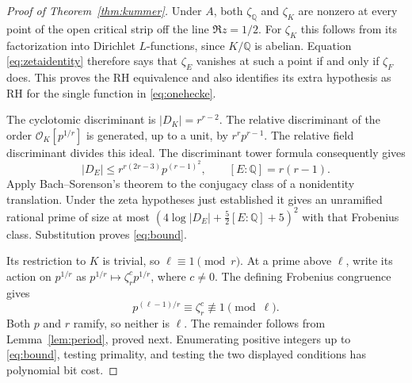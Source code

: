 \documentclass[11pt]{article}
\newcommand{\Q}{\mathbb Q}
\theoremstyle{definition}
\theoremstyle{remark}
\begin{document}
\begin{proof}[Proof of Theorem~\ref{thm:kummer}]
Under $A$, both $\zeta_{\Q}$ and $\zeta_K$ are nonzero at
every point of the open critical strip off the line $\Re z=1/2$.
For $\zeta_K$ this follows from its factorization into Dirichlet
$L$-functions, since $K/\Q$ is abelian.  Equation
\eqref{eq:zetaidentity} therefore says that $\zeta_E$ vanishes at
such a point if and only if $\zeta_F$ does.  This proves the RH
equivalence and also identifies its extra hypothesis as RH for
the single function in \eqref{eq:onehecke}.

The cyclotomic discriminant is $|D_K|=r^{r-2}$.
The relative discriminant of the order $\mathcal O_K[p^{1/r}]$
is generated, up to a unit, by $r^r p^{r-1}$.  The relative
field discriminant divides this ideal.  The discriminant tower
formula consequently gives
\[
 |D_E|\le r^{r(2r-3)}p^{(r-1)^2},\qquad [E:\Q]=r(r-1).
\]
Apply Bach--Sorenson's theorem to the conjugacy class of a
nonidentity translation.  Under the zeta hypotheses just established
it gives an unramified rational prime of size at most
$(4\log|D_E|+\tfrac52[E:\Q]+5)^2$ with that Frobenius class.
Substitution proves \eqref{eq:bound}.

Its restriction to $K$ is trivial, so $\ell\equiv1\pmod r$.
At a prime above $\ell$, write its action on $p^{1/r}$ as
$p^{1/r}\mapsto\zeta_r^c p^{1/r}$, where $c\ne0$.
The defining Frobenius congruence gives
\[
 p^{(\ell-1)/r}\equiv\zeta_r^c\not\equiv1\pmod\ell.
\]
Both $p$ and $r$ ramify, so neither is $\ell$.
The remainder follows from Lemma~\ref{lem:period}, proved next.
Enumerating positive integers up to \eqref{eq:bound}, testing primality,
and testing the two displayed conditions has polynomial bit cost.
\end{proof}
\end{document}
